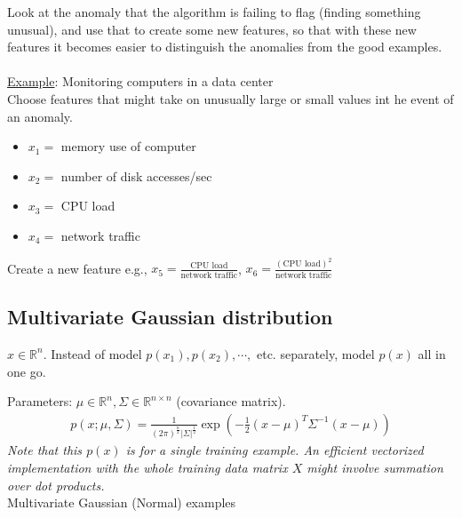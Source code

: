 Look at the anomaly that the algorithm is failing to flag (finding something unusual), and use that to create some new features, so that with these new features it becomes easier to distinguish the anomalies from the good examples.
\\\\
\underline{Example}: Monitoring computers in a data center\\
Choose features that might take on unusually large or small values int he event of an anomaly.
\begin{itemize}
\item[]
$x_1 = $ memory use of computer
\item[]
$x_2 = $ number of disk accesses/sec
\item[]
$x_3 = $ CPU load
\item[]
$x_4 = $ network traffic
\end{itemize}

Create a new feature e.g., $x_5 = \frac{\text{CPU load}}{\text{network traffic}}$, $x_6 = \frac{(\text{CPU load})^2}{\text{network traffic}}$

%
\subsection{Multivariate Gaussian distribution}
$x \in \mathbb{R}^n$. Instead of model $p(x_1), p(x_2), \cdots,$ etc. separately, model $p(x)$ all in one go.

Parameters: $\mu \in \mathbb{R}^n, \Sigma \in \mathbb{R}^{n \times n}$ (covariance matrix).
\begin{align}
p(x; \mu, \Sigma) =  \frac{1}{(2\pi)^{\frac{n}{2}}|\Sigma|^{\frac{1}{2}}}\exp{(-\frac{1}{2}(x-\mu)^T\Sigma^{-1}(x-\mu))}
\end{align}
\emph{\textcolor{Bittersweet}{Note that this $p(x)$ is for a single training example. An efficient vectorized implementation with the whole training data matrix $X$ might involve summation over dot products.}}\\

Multivariate Gaussian (Normal) examples


